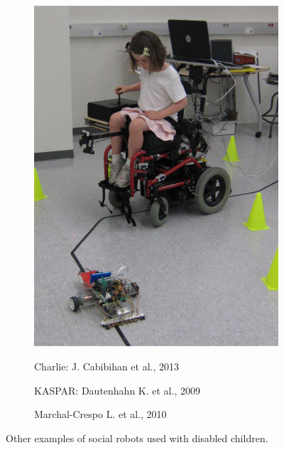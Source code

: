\documentclass[a4paper,twoside]{book}
\begin{document}
\begin{figure}[bh]
\begin{subfigure}[b]{0.3\textwidth}
\end{subfigure}\quad
\begin{subfigure}[b]{0.3\textwidth}
\includegraphics[width=\textwidth]{img/Marchal-Crespo}
\end{subfigure}

\begin{subfigure}[t]{0.3\textwidth}
\caption{Charlie: J. Cabibihan et al., 2013}
\end{subfigure}\quad
\begin{subfigure}[t]{0.3\textwidth}
\caption{KASPAR: Dautenhahn K. et al., 2009}
\end{subfigure}\quad
\begin{subfigure}[t]{0.3\textwidth}
\caption{Marchal-Crespo L. et al., 2010}
\end{subfigure}

\caption{Other examples of social robots used with disabled children.}
\end{figure}
 
\end{document}
